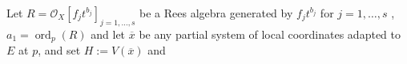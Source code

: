 \documentclass{amsart}
\newcommand{\cA}{{\mathcal A}}
\newcommand{\cO}{{\mathcal O}}
\newcommand{\Int}{{\operatorname{Int}}}
\newcommand{\ord}{{\operatorname{ord}}}
\begin{document}
	



Let $R=\cO_X[f_jt^{b_j}]_{j=1,\ldots,s}$ be a Rees algebra  generated by $f_jt^{b_j}$  for $j=1,\ldots,s$ , $a_1=\ord_p(R)$ and let $\overline{x}$  be any partial system of local coordinates adapted  to $E$ at $p$, and  set $H:=V(\overline{x})$ and %




\end{document}
